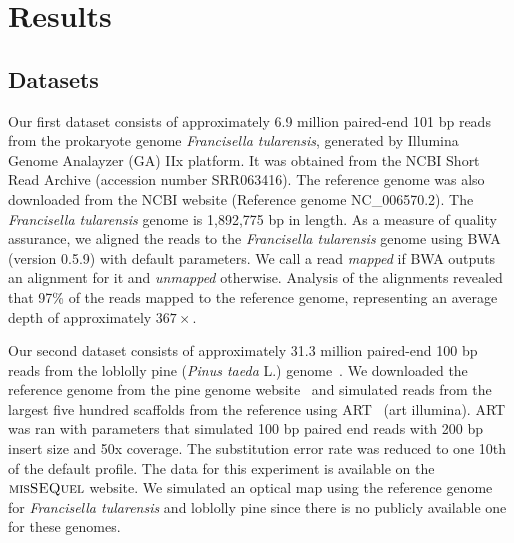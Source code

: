 \section{Results} \label{sec:results} 

\subsection{Datasets} \label{subsec:data}

Our first dataset consists of approximately 6.9 million paired-end 101 bp reads from the prokaryote genome {\em Francisella tularensis}, generated by Illumina Genome Analayzer (GA) IIx platform. 
It was obtained from the NCBI Short Read Archive (accession number SRR063416). The reference genome was also downloaded from the NCBI website (Reference genome NC\_006570.2).  
The {\em  Francisella tularensis} genome is 1,892,775 bp in length. As a measure of quality assurance, we aligned the reads to the {\em Francisella tularensis} genome using BWA (version 0.5.9) \cite{bwa} with default parameters.  
We call a read {\em mapped} if BWA outputs an alignment for it and {\em unmapped} otherwise.  
Analysis of the alignments revealed that 97\% of the reads mapped to the reference genome, representing an average depth of approximately $367\times$.  

Our second dataset consists of approximately  31.3 million paired-end 100 bp reads from the loblolly pine  ({\em Pinus taeda} L.) genome~\cite{pine}.  
We downloaded the reference genome from the pine genome website~\cite{pinetreeweb} and simulated reads from the largest five hundred scaffolds from the reference using ART~\cite{art} (art illumina). 
ART was ran with parameters that simulated 100 bp paired end reads with 200 bp insert size and 50x coverage.  
The substitution error rate was reduced to one 10th of the default profile.  
The data for this experiment is available on the $\mbox{\rm {\sc misSEQuel}}$ website.  
We simulated an optical map using the reference genome for {\em Francisella tularensis} and loblolly pine since there is no publicly available one for these genomes.  




